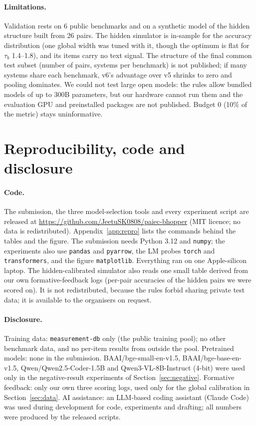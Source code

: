 \documentclass{article}
\begin{document}
\paragraph{Limitations.} Validation rests on 6 public benchmarks and on a synthetic model of the hidden structure built from 26
pairs. The hidden simulator is in-sample for the accuracy distribution (one global width was tuned with it, though the optimum is
flat for $\tau_b$ 1.4--1.8), and its items carry no text signal. The structure of the final common test subset (number of pairs,
systems per benchmark) is not published; if many systems share each benchmark, v6's advantage over v5 shrinks to zero and pooling
dominates. We could not test large open models: the rules allow bundled models of up to 300B parameters, but our hardware cannot run
them and the evaluation GPU and preinstalled packages are not published. Budget 0 (10\% of the metric) stays uninformative.

\section{Reproducibility, code and disclosure}
\label{sec:repro}

\paragraph{Code.} The submission, the three model-selection tools and every experiment script are released at
\url{https://github.com/JeetuSK0808/paiec-bhopper} (MIT licence; no data is redistributed). Appendix~\ref{app:repro} lists the
commands behind the tables and the figure. The submission needs Python 3.12 and \texttt{numpy}; the experiments also use
\texttt{pandas} and \texttt{pyarrow}, the LM probes \texttt{torch} and \texttt{transformers}, and the figure \texttt{matplotlib}.
Everything ran on one Apple-silicon laptop. The hidden-calibrated simulator also reads one small table derived from our own formative-feedback
logs (per-pair accuracies of the hidden pairs we were scored on). It is not redistributed, because the rules forbid sharing
private test data; it is available to the organisers on request.

\paragraph{Disclosure.} Training data: \texttt{measurement-db} only (the public training pool); no other benchmark data, and no
per-item results from outside the pool. Pretrained models: none in the submission. BAAI/bge-small-en-v1.5, BAAI/bge-base-en-v1.5,
Qwen/Qwen2.5-Coder-1.5B and Qwen3-VL-8B-Instruct (4-bit) were used only in the negative-result experiments of
Section~\ref{sec:negative}. Formative feedback: only our own three scoring logs, used only for the global calibration in
Section~\ref{sec:data}. AI assistance: an LLM-based coding assistant (Claude Code) was used during development for code,
experiments and drafting; all numbers were produced by the released scripts.
\end{document}
